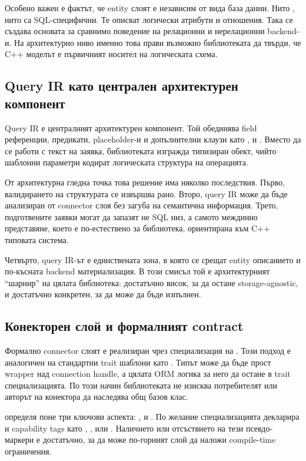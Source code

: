 Особено важен е фактът, че entity слоят е независим от вида база данни. Нито , нито  са SQL-специфични. Те описват логически атрибути и отношения. Така се създава основата за сравнимо поведение на релационни и нерелационни backend-и. На архитектурно ниво именно това прави възможно библиотеката да твърди, че C++ моделът е първичният носител на логическата схема.

\subsection{Query IR като централен архитектурен компонент}

Query IR е централният архитектурен компонент. Той обединява field референции, предикати, placeholder-и и допълнителни клаузи като ,  и . Вместо да се работи с текст на заявка, библиотеката изгражда типизиран обект, чийто шаблонни параметри кодират логическата структура на операцията.

От архитектурна гледна точка това решение има няколко последствия. Първо, валидирането на структурата се извършва рано. Второ, query IR може да бъде анализиран от connector слоя без загуба на семантична информация. Трето, подготвените заявки могат да запазят не SQL низ, а самото междинно представяне, което е по-естествено за библиотека, ориентирана към C++ типовата система.

Четвърто, query IR-ът е единствената зона, в която се срещат entity описанието и по-късната backend материализация. В този смисъл той е архитектурният ``шарнир'' на цялата библиотека: достатъчно висок, за да остане storage-agnostic, и достатъчно конкретен, за да може да бъде изпълнен.

\subsection{Конекторен слой и формалният contract}

Формално connector слоят е реализиран чрез специализация на . Този подход е аналогичен на стандартни trait шаблони като . Типът  може да бъде прост wrapper над connection handle, а цялата ORM логика за него да остане в trait специализацията. По този начин библиотеката не изисква потребителят или авторът на конектора да наследява общ базов клас.

 определя поне три ключови аспекта: ,  и . По желание специализацията декларира и capability tags като , ,  или . Наличието или отсъствието на тези псевдо-маркери е достатъчно, за да може по-горният слой да наложи compile-time ограничения.

